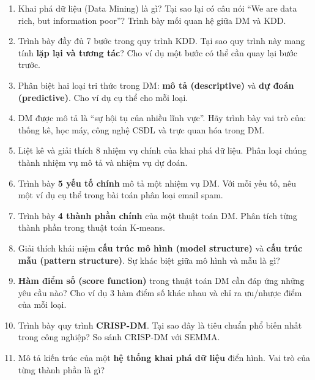 \documentclass[10pt]{article}
\begin{document}
\begin{enumerate}[leftmargin=*, label=\textbf{Câu \arabic*.}]

    \item Khai phá dữ liệu (Data Mining) là gì? Tại sao lại có câu nói ``We are data rich, but information poor''? Trình bày mối quan hệ giữa DM và KDD.

    \item Trình bày đầy đủ 7 bước trong quy trình KDD. Tại sao quy trình này mang tính \textbf{lặp lại và tương tác}? Cho ví dụ một bước có thể cần quay lại bước trước.

    \item Phân biệt hai loại tri thức trong DM: \textbf{mô tả (descriptive)} và \textbf{dự đoán (predictive)}. Cho ví dụ cụ thể cho mỗi loại.

    \item DM được mô tả là ``sự hội tụ của nhiều lĩnh vực''. Hãy trình bày vai trò của: thống kê, học máy, công nghệ CSDL và trực quan hóa trong DM.

    \item Liệt kê và giải thích 8 nhiệm vụ chính của khai phá dữ liệu. Phân loại chúng thành nhiệm vụ mô tả và nhiệm vụ dự đoán.

    \item Trình bày \textbf{5 yếu tố chính} mô tả một nhiệm vụ DM. Với mỗi yếu tố, nêu một ví dụ cụ thể trong bài toán phân loại email spam.

    \item Trình bày \textbf{4 thành phần chính} của một thuật toán DM. Phân tích từng thành phần trong thuật toán K-means.

    \item Giải thích khái niệm \textbf{cấu trúc mô hình (model structure)} và \textbf{cấu trúc mẫu (pattern structure)}. Sự khác biệt giữa mô hình và mẫu là gì?

    \item \textbf{Hàm điểm số (score function)} trong thuật toán DM cần đáp ứng những yêu cầu nào? Cho ví dụ 3 hàm điểm số khác nhau và chỉ ra ưu/nhược điểm của mỗi loại.

    \item Trình bày quy trình \textbf{CRISP-DM}. Tại sao đây là tiêu chuẩn phổ biến nhất trong công nghiệp? So sánh CRISP-DM với SEMMA.

    \item Mô tả kiến trúc của một \textbf{hệ thống khai phá dữ liệu} điển hình. Vai trò của từng thành phần là gì?


\end{enumerate}
\end{document}
